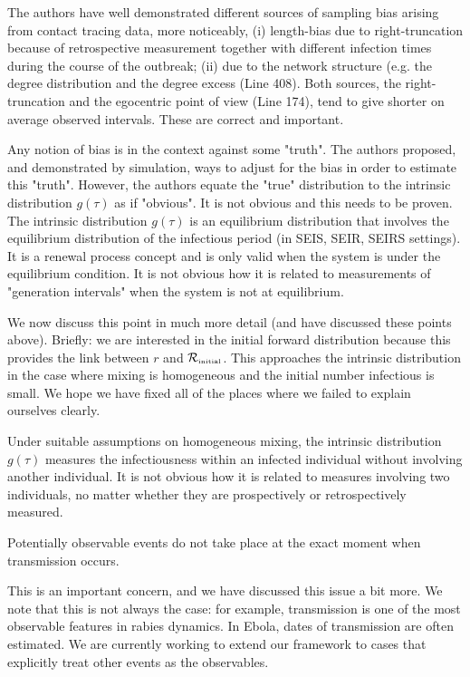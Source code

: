 \documentclass[12pt]{article}
\newcommand{\Rx}[1]{\ensuremath{{\cal R}_{#1}}}
\newcommand{\Rini}{\Rx{\textrm{\tiny initial}}}
\newcommand{\revtext}{\textsf}
\begin{document}
\revtext{
The authors have well demonstrated different sources of sampling bias
arising from contact tracing data, more noticeably, (i) length-bias due
to right-truncation because of retrospective measurement together with
different infection times during the course of the outbreak; (ii) due to the
network structure (e.g. the degree distribution and the degree excess (Line
408). Both sources, the right-truncation and the egocentric point of view
(Line 174), tend to give shorter on average observed intervals. These are
correct and important.
}

\revtext{
Any notion of bias is in the context against some "truth". The authors
proposed, and demonstrated by simulation, ways to adjust for the bias in
order to estimate this "truth". However, the authors equate the "true"
distribution to the intrinsic distribution $g(\tau)$ as if "obvious". It is not
obvious and this needs to be proven.
The intrinsic distribution $g(\tau)$ is an equilibrium distribution that
involves the equilibrium distribution of the infectious period (in SEIS,
SEIR, SEIRS settings). It is a renewal process concept and is only
valid when the system is under the equilibrium condition. It is not
obvious how it is related to measurements of "generation intervals"
when the system is not at equilibrium.
}

We now discuss this point in much more detail (and have discussed these points above). Briefly: we are interested in the initial forward distribution because this provides the link between $r$ and \Rini. This approaches the intrinsic distribution in the case where mixing is homogeneous and the initial number infectious is small. We hope we have fixed all of the places where we failed to explain ourselves clearly.

\revtext{
 Under suitable assumptions on homogeneous mixing, the intrinsic
distribution $g(\tau)$ measures the infectiousness within an infected individual without involving another individual. It is not obvious how it
is related to measures involving two individuals, no matter whether
they are prospectively or retrospectively measured.
}

\revtext{
Potentially observable events do not take place at the exact moment
when transmission occurs.
}

This is an important concern, and we have discussed this issue a bit more. We note that this is not always the case: for example, transmission is one of the most observable features in rabies dynamics. In Ebola, dates of transmission are often estimated. We are currently working to extend our framework to cases that explicitly treat other events as the observables.
\end{document}
